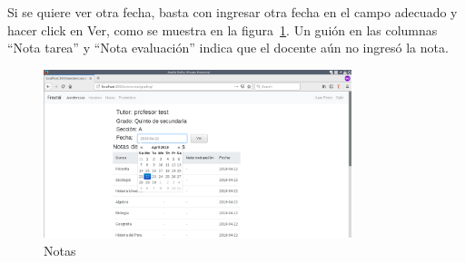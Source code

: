 \documentclass[12pt]{article}
\begin{document}
Si se quiere ver otra fecha, basta con ingresar otra fecha en el campo adecuado y hacer click en 
Ver, como se muestra en la figura~\ref{fig:notas_cal}.
Un gui\'on en las columnas ``Nota tarea'' y ``Nota evaluaci\'on'' indica que el docente a\'un 
no ingres\'o la nota.
\begin{figure}[ht]
  \centering
  \includegraphics[width=0.8\textwidth]{images/apoderado4.png}
  \caption{Notas}
  \label{fig:notas_cal}
\end{figure}

\newpage
\end{document}
